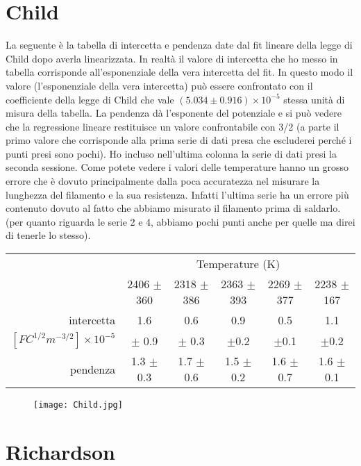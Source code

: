 \documentclass{article}
\begin{document}
\section*{Child}

La seguente è la tabella di intercetta e pendenza date dal fit lineare della legge di Child dopo averla linearizzata. In realtà il valore di intercetta che ho messo in tabella corrisponde all'esponenziale della vera intercetta del fit. In questo modo il valore (l'esponenziale della vera intercetta) può essere confrontato con il coefficiente della legge di Child che vale $(5.034 \pm 0.916) \times 10^{-5}$ stessa unità di misura della tabella. La pendenza dà l'esponente del potenziale e si può vedere che la regressione lineare restituisce un valore confrontabile con 3/2 (a parte il primo valore che corrisponde alla prima serie di dati presa che escluderei perché i punti presi sono pochi). Ho incluso nell'ultima colonna la serie di dati presi la seconda sessione. Come potete vedere i valori delle temperature hanno un grosso errore che è dovuto principalmente dalla poca accuratezza nel misurare la lunghezza del filamento e la sua resistenza. Infatti l'ultima serie ha un errore più contenuto dovuto al fatto che abbiamo misurato il filamento prima di saldarlo. (per quanto riguarda le serie 2 e 4, abbiamo pochi punti anche per quelle ma direi di tenerle lo stesso).


\begin{center}
\begin{tabular}{rccccc}
&\multicolumn{5}{c}{Temperature (K)}\\
&2406 $\pm$ 360& 	2318 $\pm$ 386&	2363 $\pm$ 393 &	2269 $\pm$ 377&	2238 $\pm$ 167\\ \hline
intercetta&	1.6&	0.6&	0.9&	0.5&	1.1\\
$[F C^{1/2} m^{-3/2}] \times 10^{-5}$&	$\pm$ 0.9&	$\pm$ 0.3&	$\pm$0.2&	$\pm$0.1&	$\pm$0.2	  \\ \hline
pendenza&	1.3 $\pm$ 0.3	&	1.7 $\pm$ 0.6&	1.5 $\pm$ 0.2&	1.6 $\pm$ 0.7&	1.6 $\pm$ 0.1\\ \hline \hline
\end{tabular}
\end{center}

\begin{figure}[htbp]
		\centering
			\texttt{[image: Child.jpg]}
\end{figure}

\section*{Richardson}
\end{document}

